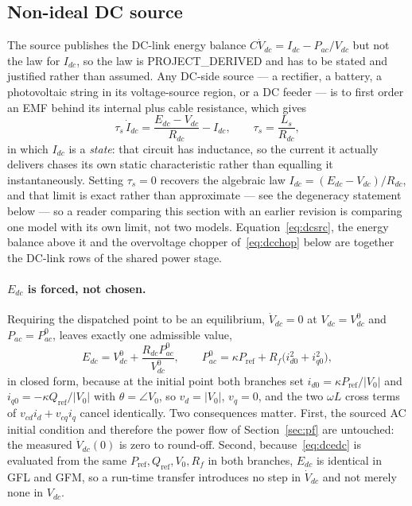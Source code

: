 \documentclass[12pt,a4paper]{article}
\theoremstyle{remark}
\begin{document}
\subsection{Non-ideal DC source}\label{sec:dcsource}
The source publishes the DC-link energy balance
$C\dot V_{dc}=I_{dc}-P_{ac}/V_{dc}$ but not the law for $I_{dc}$, so the law is
\textsf{PROJECT\_DERIVED} and has to be stated and justified rather than
assumed. Any DC-side source --- a rectifier, a battery, a photovoltaic string in
its voltage-source region, or a DC feeder --- is to first order an EMF behind its
internal plus cable resistance, which gives
\begin{equation}
  \tau_s\,\dot I_{dc}=\frac{E_{dc}-V_{dc}}{R_{dc}}-I_{dc},
  \qquad \tau_s=\frac{L_s}{R_{dc}},
  \label{eq:dcsrc}
\end{equation}
in which $I_{dc}$ is a \emph{state}: that circuit has inductance, so the current
it actually delivers chases its own static characteristic rather than equalling it
instantaneously. Setting $\tau_s=0$ recovers the algebraic law
$I_{dc}=(E_{dc}-V_{dc})/R_{dc}$, and that limit is exact rather than approximate
--- see the degeneracy statement below --- so a reader comparing this section with
an earlier revision is comparing one model with its own limit, not two models.
Equation~\eqref{eq:dcsrc}, the energy balance above it and the overvoltage
chopper of~\eqref{eq:dcchop} below are together the DC-link rows of the shared
power stage.

\paragraph{$E_{dc}$ is forced, not chosen.} Requiring the dispatched point to be
an equilibrium, $\dot V_{dc}=0$ at $V_{dc}=V_{dc}^{0}$ and $P_{ac}=P_{ac}^{0}$,
leaves exactly one admissible value,
\begin{equation}
  E_{dc}=V_{dc}^{0}+\frac{R_{dc}P_{ac}^{0}}{V_{dc}^{0}},\qquad
  P_{ac}^{0}=\kappa P_{\mathrm{ref}}+R_f\bigl(i_{d0}^{2}+i_{q0}^{2}\bigr),
  \label{eq:dcedc}
\end{equation}
in closed form, because at the initial point both branches set
$i_{d0}=\kappa P_{\mathrm{ref}}/|V_0|$ and $i_{q0}=-\kappa Q_{\mathrm{ref}}/|V_0|$
with $\theta=\angle V_0$, so $v_d=|V_0|$, $v_q=0$, and the two $\omega L$ cross
terms of $v_{cd}i_d+v_{cq}i_q$ cancel identically. Two consequences matter.
First, the sourced AC initial condition and therefore the power flow of
Section~\ref{sec:pf} are untouched: the measured $\dot V_{dc}(0)$ is zero to
round-off. Second, because~\eqref{eq:dcedc} is evaluated from the same
$P_{\mathrm{ref}},Q_{\mathrm{ref}},V_0,R_f$ in both branches, $E_{dc}$ is
identical in GFL and GFM, so a run-time transfer introduces no step in
$\dot V_{dc}$ and not merely none in $V_{dc}$.
\end{document}
